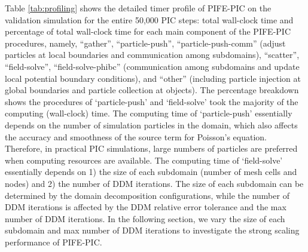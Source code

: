 \documentclass{siamart171218}
\begin{document}
Table \ref{tab:profiling} shows the detailed timer profile of PIFE-PIC
on the validation simulation
for the entire 50,000 PIC steps:
total wall-clock time and
percentage of total wall-clock time
for each main component of the PIFE-PIC procedures, namely,
``gather'',
``particle-push'',
``particle-push-comm'' (adjust particles at local boundaries and communication among subdomains),
``scatter'',
``field-solve'',
``field-solve-phibc'' (communication among subdomains
and update local potential boundary conditions),
and ``other'' (including particle injection at global boundaries
and particle collection at objects).
The percentage breakdown shows
the procedures of `particle-push' and `field-solve'
took the majority of the computing (wall-clock) time.
The computing time of `particle-push' essentially depends on the number of simulation particles
in the domain,
which also affects the accuracy and smoothness of the source term for Poisson's equation.
Therefore, in practical PIC simulations,
large numbers of particles are preferred when computing resources are available.
The computing time of `field-solve' essentially
depends on 1) the size of each subdomain (number of mesh cells and nodes)
and 2) the number of DDM iterations.
The size of each subdomain can be determined by the domain decomposition configurations,
while the number of DDM iterations is affected by
the DDM relative error tolerance and the max number of DDM iterations.
In the following section, we vary the size of each subdomain
and max number of DDM iterations
to investigate the strong scaling performance of PIFE-PIC.
\end{document}
